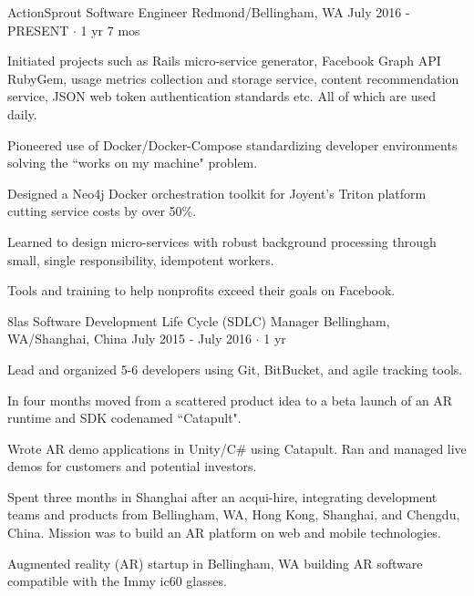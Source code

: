 \documentclass[11pt, a4paper]{awesome-cv}
\begin{document}
\begin{cventries}
  \cventry
    {ActionSprout} %
    {Software Engineer} %
    {Redmond/Bellingham, WA} %
    {July 2016 - PRESENT $\cdot$ 1 yr 7 mos} %
    {
      \begin{cvitems} %
        \item Initiated projects such as Rails micro-service generator, Facebook Graph API RubyGem, usage metrics collection and storage service, content recommendation service, JSON web token authentication standards etc. All of which are used daily.
        \item Pioneered use of Docker/Docker-Compose standardizing developer environments solving the ``works on my machine" problem.
        \item Designed a Neo4j Docker orchestration toolkit for Joyent's Triton platform cutting service costs by over 50\%.
        \item Learned to design micro-services with robust background processing through small, single responsibility, idempotent workers.
      \end{cvitems}
    }
    {
      Tools and training to help nonprofits exceed their goals on Facebook.
    }

  \cventry
    {8las} %
    {Software Development Life Cycle (SDLC) Manager} %
    {Bellingham, WA/Shanghai, China} %
    {July 2015 - July 2016 $\cdot$ 1 yr} %
    {
      \begin{cvitems} %
        \item Lead and organized 5-6 developers using Git, BitBucket, and agile tracking tools.
        \item In four months moved from a scattered product idea to a beta launch of an AR runtime and SDK codenamed ``Catapult".
        \item Wrote AR demo applications in Unity/C\# using Catapult. Ran and managed live demos for customers and potential investors.
        \item Spent three months in Shanghai after an acqui-hire, integrating development teams and products from Bellingham, WA, Hong Kong, Shanghai, and Chengdu, China. Mission was to build an AR platform on web and mobile technologies.
      \end{cvitems}
    }
    {
      Augmented reality (AR) startup in Bellingham, WA building AR software compatible with the Immy ic60 glasses.
    }


\end{cventries}
\end{document}
